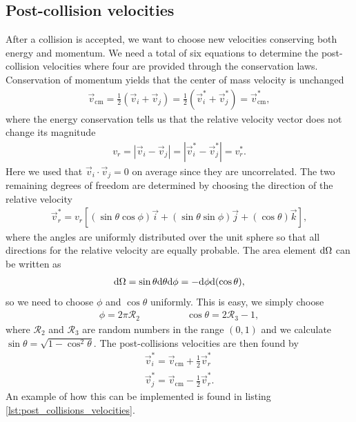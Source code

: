 \subsection{Post-collision velocities}
After a collision is accepted, we want to choose new velocities conserving both energy and momentum. We need a total of six equations to determine the post-collision velocities where four are provided through the conservation laws. Conservation of momentum yields that the center of mass velocity is unchanged
\begin{align}
	\vec v_\text{cm} = \frac{1}{2}(\vec v_i + \vec v_j) = \frac{1}{2}(\vec v_i^* + \vec v_j^*) = \vec v_\text{cm}^*,
\end{align}
where the energy conservation tells us that the relative velocity vector does not change its magnitude
\begin{align}
	v_r = |\vec v_i - \vec v_j| = |\vec v_i^* - \vec v_j^*| = v_r^*.
\end{align}
Here we used that $\vec v_i\cdot\vec v_j = 0$ on average since they are uncorrelated. The two remaining degrees of freedom are determined by choosing the direction of the relative velocity
\begin{align}
	\vec v_r^* = v_r\left[(\sin\theta\cos\phi)\vec i + (\sin\theta\sin\phi) \vec j + (\cos\theta)\vec k\right],
\end{align}
where the angles are uniformly distributed over the unit sphere so that all directions for the relative velocity are equally probable. The area element $\mathrm{d}\Omega$ can be written as
\begin{align}
	\mathrm{d}\Omega = \sin\theta \mathrm{d}\theta \mathrm{d}\phi = -\mathrm{d}\phi \mathrm{d}(\cos\theta),
\end{align}
so we need to choose $\phi$ and $\cos\theta$ uniformly. This is easy, we simply choose 
\begin{align*}
	\phi = 2\pi\mathcal{R}_2 & \qquad \qquad \cos\theta = 2\mathcal{R}_3 - 1,
\end{align*}
where $\mathcal{R}_2$ and $\mathcal{R}_3$ are random numbers in the range $(0,1)$ and we calculate $\sin\theta = \sqrt{1 - \cos^2\theta}$. The post-collisions velocities are then found by
\begin{align}
	\vec v_i^* = \vec v_\text{cm} + \frac{1}{2}\vec v_r^*\\
	\vec v_j^* = \vec v_\text{cm} - \frac{1}{2}\vec v_r^*.
\end{align}
An example of how this can be implemented is found in listing \ref{lst:post_collisions_velocities}.
